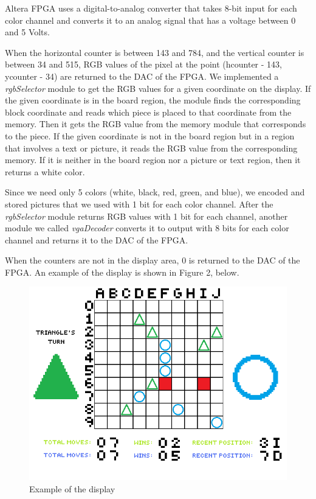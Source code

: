 \documentclass[conference]{IEEEtran}
\begin{document}
Altera FPGA uses a digital-to-analog converter that takes 8-bit input for each color channel and converts it to an analog signal that has a voltage between 
0 and 5 Volts. \cite{fpga} \\
\par When the horizontal counter is between 143 and 784, and the vertical counter is between 34 and 515, RGB values of the pixel at the point (hcounter - 143, ycounter - 34) are returned to the DAC of the FPGA. 
We implemented a \textit{rgbSelector} module to get the RGB values for a given coordinate on the display. 
If the given coordinate is in the board region, the module finds the corresponding block coordinate and reads which piece is 
placed to that coordinate from the memory. Then it gets the RGB value from the memory module that corresponds to the piece. 
If the given coordinate is not in the board region but in a region that involves a text or picture, it reads the RGB value from the corresponding memory. 
If it is neither in the board region nor a picture or text region, then it returns a white color. \\
\par Since we need only 5 colors (white, black, red, green, and blue), we encoded and stored pictures that we used with 1 bit for each color channel. 
After the \textit{rgbSelector} module returns RGB values with 1 bit for each channel, 
another module we called \textit{vgaDecoder} converts it to output with 8 bits for each color channel and returns it to the DAC of the FPGA. \\
\par When the counters are not in the display area, 0 is returned to the DAC of the FPGA. 
An example of the display is shown in Figure 2, below.  
\begin{figure}[H]
  \centerline{\includegraphics[scale=0.65, frame]{sample_board.png}}
   \caption{Example of the display}
\end{figure} 
\end{document}
